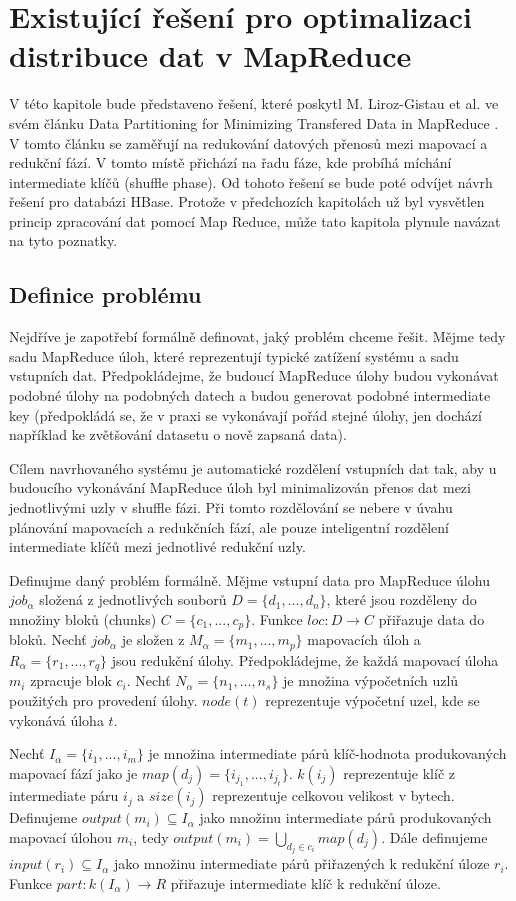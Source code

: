 \documentclass[thesis=M,czech]{FITthesis}[2012/06/26]
\begin{document}
\chapter{Existující řešení pro optimalizaci distribuce dat v MapReduce}
V této kapitole bude představeno řešení, které poskytl M. Liroz-Gistau et al. ve svém článku Data Partitioning for Minimizing Transfered Data in MapReduce \cite{gistau}. V tomto článku se zaměřují na redukování datových přenosů mezi mapovací a redukční fází. V tomto místě přichází na řadu fáze, kde probíhá míchání intermediate klíčů (shuffle phase). Od tohoto řešení se bude poté odvíjet návrh řešení pro databázi HBase. Protože v předchozích kapitolách už byl vysvětlen princip zpracování dat pomocí Map Reduce, může tato kapitola plynule navázat na tyto poznatky. 

\section{Definice problému}
Nejdříve je zapotřebí formálně definovat, jaký problém chceme řešit. Mějme tedy sadu MapReduce úloh, které reprezentují typické zatížení systému a sadu vstupních dat. Předpokládejme, že budoucí MapReduce úlohy budou vykonávat podobné úlohy na podobných datech a budou generovat podobné intermediate key (předpokládá se, že v praxi se vykonávají pořád stejné úlohy, jen dochází například ke zvětšování datasetu o nově zapsaná data). 

Cílem navrhovaného systému je automatické rozdělení vstupních dat tak, aby u budoucího vykonávání MapReduce úloh byl minimalizován přenos dat mezi jednotlivými uzly v shuffle fázi. Při tomto rozdělování se nebere v úvahu plánování mapovacích a redukčních fází, ale pouze inteligentní rozdělení intermediate klíčů mezi jednotlivé redukční uzly.

	Definujme daný problém formálně. Mějme vstupní data pro MapReduce úlohu $job_\alpha$ složená z jednotlivých souborů $D = \{d_1, ..., d_n\}$, které jsou rozděleny do  množiny bloků (chunks) $C = \{c_1, ..., c_p\}$. Funkce $loc : D \rightarrow C$ přiřazuje data do bloků. Nechť  $job_\alpha$ je složen z $M_\alpha = \{m_1, ..., m_p\}$ mapovacích úloh a $R_\alpha = \{r_1, ..., r_q\}$ jsou redukční úlohy. Předpokládejme, že každá mapovací úloha $m_i$ zpracuje blok $c_i$. Nechť  $N_\alpha = \{n_1, ..., n_s\}$ je množina výpočetních uzlů použitých pro provedení úlohy. $node(t)$ reprezentuje výpočetní uzel, kde se vykonává úloha $t$.

Nechť $I_\alpha = \{i_1, ..., i_m\}$ je množina intermediate párů klíč-hodnota produkovaných mapovací fází jako je $map(d_j) = \{i_{j_1}, ..., i_{j_t}\}$. $k(i_j)$ reprezentuje klíč z intermediate páru $i_j$ a $size(i_j)$ reprezentuje celkovou velikost v bytech. Definujeme $output(m_i) \subseteq I_\alpha$ jako množinu intermediate párů produkovaných mapovací úlohou $m_i$, tedy $output(m_i) = \bigcup_{{d_j}\in{c_i}} map(d_j)$. Dále definujeme $input(r_i)\subseteq I_\alpha$ jako množinu intermediate párů přiřazených k redukční úloze $r_i$. Funkce $part : k(I_\alpha) \rightarrow R$ přiřazuje intermediate klíč k redukční úloze. 
\end{document}
